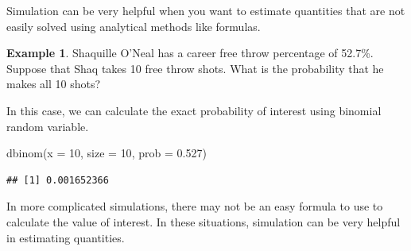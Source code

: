 \documentclass[
  11pt,
]{book}
\newenvironment{Shaded}{\begin{snugshade}}{\end{snugshade}}
\newcommand{\AttributeTok}[1]{\textcolor[rgb]{0.77,0.63,0.00}{#1}}
\newcommand{\DecValTok}[1]{\textcolor[rgb]{0.00,0.00,0.81}{#1}}
\newcommand{\FloatTok}[1]{\textcolor[rgb]{0.00,0.00,0.81}{#1}}
\newcommand{\FunctionTok}[1]{\textcolor[rgb]{0.00,0.00,0.00}{#1}}
\newcommand{\NormalTok}[1]{#1}
\theoremstyle{definition}
\theoremstyle{definition}
\newtheorem{example}{Example}[chapter]
\theoremstyle{definition}
\theoremstyle{definition}
\theoremstyle{remark}
\begin{document}
Simulation can be very helpful when you want to estimate quantities that are not easily solved using analytical methods like formulas.

\newpage

\begin{example}
Shaquille O'Neal has a career free throw percentage of 52.7\%. Suppose that Shaq takes 10 free throw shots. What is the probability that he makes all 10 shots?
\end{example}

In this case, we can calculate the exact probability of interest using binomial random variable.

\begin{Shaded}
\begin{Highlighting}[]
\FunctionTok{dbinom}\NormalTok{(}\AttributeTok{x =} \DecValTok{10}\NormalTok{, }\AttributeTok{size =} \DecValTok{10}\NormalTok{, }\AttributeTok{prob =} \FloatTok{0.527}\NormalTok{)}
\end{Highlighting}
\end{Shaded}

\begin{verbatim}
## [1] 0.001652366
\end{verbatim}

In more complicated simulations, there may not be an easy formula to use to calculate the value of interest. In these situations, simulation can be very helpful in estimating quantities.
\end{document}
